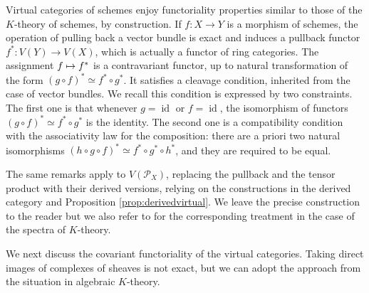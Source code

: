 \documentclass[JEP,XML,SOM,Unicode,published]{cedram}
\newcommand\mto{\mathchoice{\longmapsto}{\mapsto}{\mapsto}{\mapsto}}
\theoremstyle{plain}
\theoremstyle{definition}
\newcommand{\Pcal}{\mathcal P}
\DeclareMathOperator{\id}{id}
\begin{document}
Virtual categories of schemes enjoy functoriality properties similar to those of the $K$-theory of schemes, by construction. If $f\colon X\to Y$ is a morphism of schemes, the operation of pulling back a vector bundle is exact and induces a pullback functor $f^\ast: V(Y) \to V(X)$, which is actually a functor of ring categories. The assignment $f\mto f^{\ast}$ is a contravariant functor, up to natural transformation of the form $(g\circ f)^{\ast}\simeq f^{\ast}\circ g^{\ast}$. It satisfies a cleavage condition, inherited from the case of vector bundles. We recall this condition is expressed by two constraints. The first one is that whenever $g=\id$ or $f=\id$, the isomorphism of functors $(g\circ f)^{\ast}\simeq f^{\ast}\circ g^{\ast}$ is the identity. The second one is a compatibility condition with the associativity law for the composition: there are a priori two natural isomorphisms $(h\circ g\circ f)^{\ast}\simeq f^{\ast}\circ g^{\ast}\circ h^{\ast}$, and they are required to be equal.

The same remarks apply to $V(\Pcal_X)$, replacing the pullback and the tensor product with their derived versions, relying on the constructions in the derived category and Proposition \ref{prop:derivedvirtual}. We leave the precise construction to the reader but we also refer to \cite[, ]{ThomasonTrobaugh} for the corresponding treatment in the case of the spectra of $K$-theory.

We next discuss the covariant functoriality of the virtual categories. Taking direct images of complexes of sheaves is not exact, but we can adopt the approach from the situation in algebraic $K$-theory.
\end{document}

